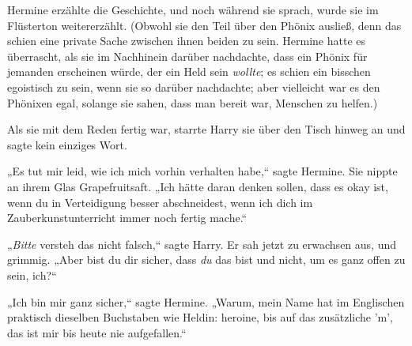 Hermine erzählte die Geschichte, und noch während sie sprach, wurde sie im Flüsterton weitererzählt. (Obwohl sie den Teil über den Phönix ausließ, denn das schien eine private Sache zwischen ihnen beiden zu sein. Hermine hatte es überrascht, als sie im Nachhinein darüber nachdachte, dass ein Phönix für jemanden erscheinen würde, der ein Held sein \emph{wollte}; es schien ein bisschen egoistisch zu sein, wenn sie so darüber nachdachte; aber vielleicht war es den Phönixen egal, solange sie sahen, dass man bereit war, Menschen zu helfen.)

Als sie mit dem Reden fertig war, starrte Harry sie über den Tisch hinweg an und sagte kein einziges Wort.

„Es tut mir leid, wie ich mich vorhin verhalten habe,“ sagte Hermine. Sie nippte an ihrem Glas Grapefruitsaft. „Ich hätte daran denken sollen, dass es okay ist, wenn du in Verteidigung besser abschneidest, wenn ich dich im Zauberkunstunterricht immer noch fertig mache.“

„\emph{Bitte} versteh das nicht falsch,“ sagte Harry. Er sah jetzt zu erwachsen aus, und grimmig. „Aber bist du dir sicher, dass \emph{du} das bist und nicht, um es ganz offen zu sein, ich?“

„Ich bin mir ganz sicher,“ sagte Hermine. „Warum, mein Name hat im Englischen praktisch dieselben Buchstaben wie Heldin: heroine, bis auf das zusätzliche 'm', das ist mir bis heute nie aufgefallen.“

